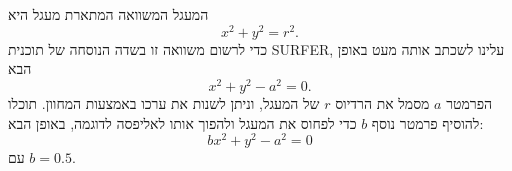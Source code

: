 \begin{surferPage}[Circle]{המעגל}
המשוואה המתארת מעגל היא
\[x^2+y^2=r^2.\]
כדי לרשום משוואה זו בשדה הנוסחה של תוכנית SURFER, עלינו לשכתב אותה מעט באופן הבא
\[x^2+y^2-a^2=0.\]
הפרמטר $a$ מסמל את הרדיוס $r$ של המעגל, וניתן לשנות את ערכו באמצעות המחוון. תוכלו להוסיף פרמטר נוסף $b$ כדי לפחוס את המעגל ולהפוך אותו לאליפסה לדוגמה, באופן הבא:
\[bx^2+y^2-a^2=0\] עם $b=0.5$.
\end{surferPage}
